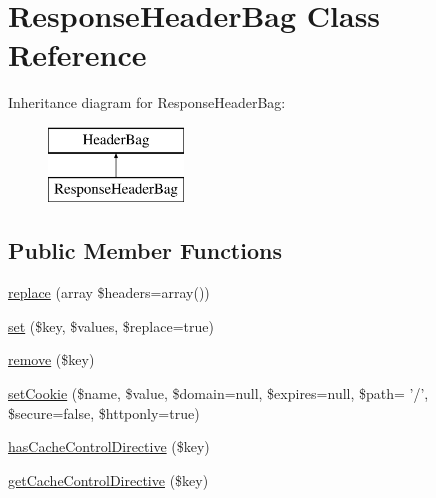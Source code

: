 \hypertarget{class_symfony_1_1_component_1_1_http_foundation_1_1_response_header_bag}{
\section{\-Response\-Header\-Bag \-Class \-Reference}
\label{class_symfony_1_1_component_1_1_http_foundation_1_1_response_header_bag}
}
\-Inheritance diagram for \-Response\-Header\-Bag\-:\begin{figure}[H]
\begin{center}
\leavevmode
\includegraphics[height=2.000000cm]{class_symfony_1_1_component_1_1_http_foundation_1_1_response_header_bag}
\end{center}
\end{figure}
\subsection*{\-Public \-Member \-Functions}
\begin{DoxyCompactItemize}
\item 
\hyperlink{class_symfony_1_1_component_1_1_http_foundation_1_1_response_header_bag_a8727b715a53cbd198c2fcd5ad93b34f8}{replace} (array \$headers=array())
\item 
\hyperlink{class_symfony_1_1_component_1_1_http_foundation_1_1_response_header_bag_a3296aad565e4d799d370a8ce7b8e3576}{set} (\$key, \$values, \$replace=true)
\item 
\hyperlink{class_symfony_1_1_component_1_1_http_foundation_1_1_response_header_bag_a95483af4e2c07dc9893fe058b026bd5d}{remove} (\$key)
\item 
\hyperlink{class_symfony_1_1_component_1_1_http_foundation_1_1_response_header_bag_a645f6c034cd6799b47bef2bc43e7056f}{set\-Cookie} (\$name, \$value, \$domain=null, \$expires=null, \$path= '/', \$secure=false, \$httponly=true)
\item 
\hyperlink{class_symfony_1_1_component_1_1_http_foundation_1_1_response_header_bag_ac9800756c1c6788144242154020190e8}{has\-Cache\-Control\-Directive} (\$key)
\item 
\hyperlink{class_symfony_1_1_component_1_1_http_foundation_1_1_response_header_bag_a1dfddc51abe579dde49fe0ef48b11d2d}{get\-Cache\-Control\-Directive} (\$key)
\end{DoxyCompactItemize}
